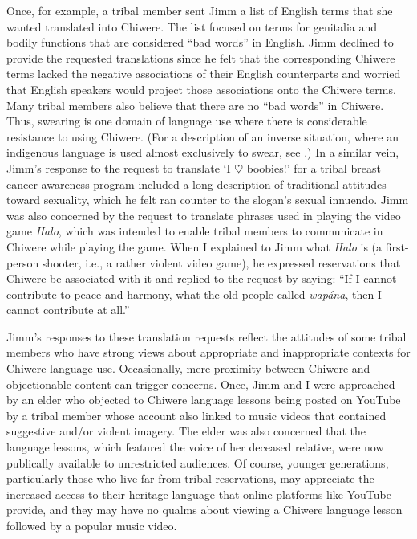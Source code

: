 \documentclass[output=paper]{LSP/langsci}
\begin{document}
Once, for example, a tribal member sent Jimm a list of English terms that she wanted translated into Chiwere. The list focused on terms for genitalia and bodily functions that are considered ``bad words'' in English. Jimm declined to provide the requested translations since he felt that the corresponding Chiwere terms lacked the negative associations of their English counterparts and worried that English speakers would project those associations onto the Chiwere terms. Many tribal members also believe that there are no ``bad words'' in Chiwere. Thus, swearing is one domain of language use where there is considerable resistance to using Chiwere. (For a description of an inverse situation, where an indigenous language is used almost exclusively to swear, see \citealt{Muehlmann2008}.) In a similar vein, Jimm's response to the request to translate `I $\heartsuit$ boobies!' for a tribal breast cancer awareness program included a long description of traditional attitudes toward sexuality, which he felt ran counter to the slogan's sexual innuendo. Jimm was also concerned by the request to translate phrases used in playing the video game \emph{Halo}, which was intended to enable tribal members to communicate in Chiwere while playing the game. When I explained to Jimm what \emph{Halo} is (a first-person shooter, i.e., a rather violent video game), he expressed reservations that Chiwere be associated with it and replied to the request by saying: ``If I cannot contribute to peace and harmony, what the old people called \emph{wap\'ana}, then I cannot contribute at all.''

Jimm's responses to these translation requests reflect the attitudes of some tribal members who have strong views about appropriate and inappropriate contexts for Chiwere language use. Occasionally, mere proximity between Chiwere and objectionable content can trigger concerns. Once, Jimm and I were approached by an elder who objected to Chiwere language lessons being posted on YouTube by a tribal member whose account also linked to music videos that contained suggestive and/or violent imagery. The elder was also concerned that the language lessons, which featured the voice of her deceased relative, were now publically available to unrestricted audiences. Of course, younger generations, particularly those who live far from tribal reservations, may appreciate the increased access to their heritage language that online platforms like YouTube provide, and they may have no qualms about viewing a Chiwere language lesson followed by a popular music video.
\end{document}
